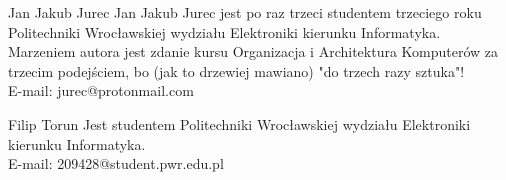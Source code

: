 \documentclass[10pt,journal,compsoc]{IEEEtran}
\begin{document}
% 
\begin{IEEEbiography}{Jan Jakub Jurec}
Jan Jakub Jurec jest po raz trzeci studentem trzeciego roku Politechniki Wrocławskiej wydziału Elektroniki kierunku Informatyka. Marzeniem autora jest zdanie kursu Organizacja i Architektura Komputerów za trzecim podejściem, bo (jak to drzewiej mawiano) "do trzech razy sztuka"! \\
E-mail: jurec@protonmail.com
\end{IEEEbiography}


\begin{IEEEbiography}{Filip Torun}
Jest studentem Politechniki Wrocławskiej wydziału Elektroniki kierunku Informatyka. \\
E-mail: 209428@student.pwr.edu.pl
\end{IEEEbiography}

\end{document}
